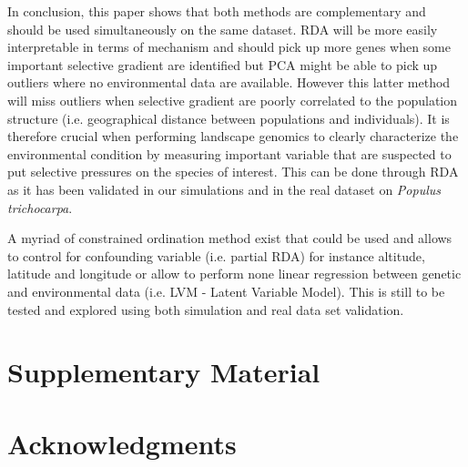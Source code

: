 \documentclass[nogrid]{MBE}%
\begin{document}
In conclusion, this paper shows that both methods are complementary and should be used simultaneously on the same dataset. RDA will be more easily interpretable in terms of mechanism and should pick up more genes when some important selective gradient are identified but PCA might be able to pick up outliers where no environmental data are available. However this latter method will miss outliers when selective gradient are poorly correlated to the population structure (i.e. geographical distance between populations and individuals). It is therefore crucial when performing landscape genomics to clearly characterize the environmental condition by measuring important variable that are suspected to put selective pressures on the species of interest. This can be done through RDA as it has been validated in our simulations and in the real dataset on \textit{Populus trichocarpa}. 

A myriad of constrained ordination method exist that could be used and allows to control for confounding variable (i.e. partial RDA) for instance altitude, latitude and longitude or allow to perform none linear regression between genetic and environmental data (i.e. LVM - Latent Variable Model). This is still to be tested and explored using both simulation and real data set validation.


\section{Supplementary Material}


\section{Acknowledgments}



\end{document}
